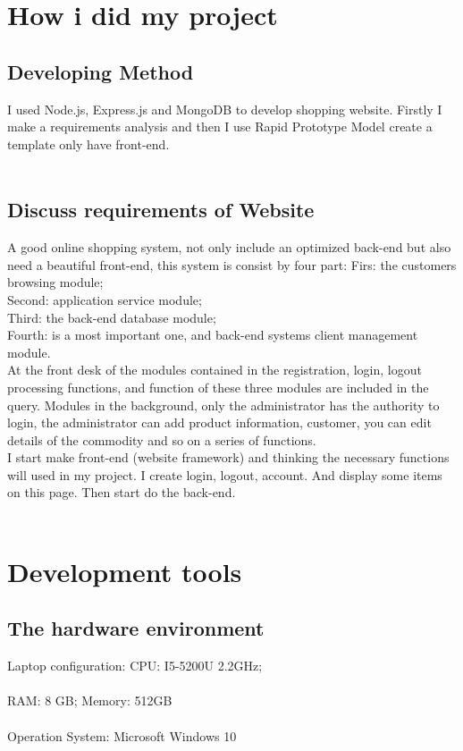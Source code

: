 \section{How i did my project}
\subsection{Developing Method}
I used Node.js, Express.js and MongoDB to develop shopping website. Firstly I make a requirements analysis and then I use Rapid Prototype Model \cite{17} create a template only have front-end.\\
\\
\subsection{Discuss requirements of Website}
A good online shopping system, not only include an optimized back-end but also need a beautiful front-end, this system is consist by four part: 
Firs: the customers browsing module;\\
Second: application service module; \\
Third: the back-end database module; \\
Fourth: is a most important one, and back-end systems client management module.\\
At the front desk of the modules contained in the registration, login, logout processing functions, and function of these three modules are included in the query. Modules in the background, only the administrator has the authority to login, the administrator can add product information, customer, you can edit details of the commodity and so on a series of functions.\\
I start make front-end (website framework) and thinking the necessary functions will used in my project. I create login, logout, account.
And display some items on this page. Then start do the back-end.\\
\\
\section{Development tools} 
\subsection{The hardware environment} 
Laptop configuration: CPU: I5-5200U 2.2GHz; \\
\\
RAM: 8 GB; Memory: 512GB\\
\\
Operation System: Microsoft Windows 10 \\
\\
